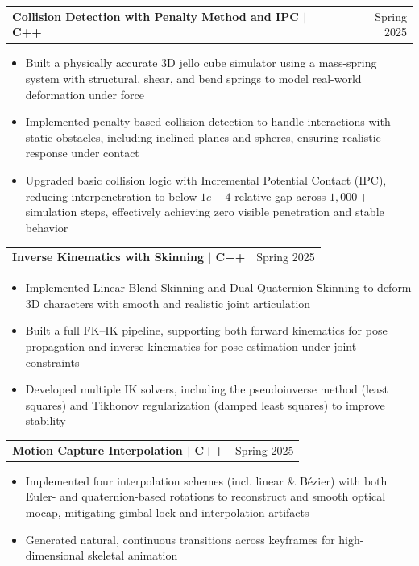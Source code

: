 \documentclass[letterpaper,11pt]{article}
\newcommand{\resumeItem}[1]{
  \item\small{
    {#1 
    }
  }
}
\newcommand{\resumeProjectHeading}[2]{
  \ifFirstSubheading
    \global\FirstSubheadingfalse
  \else
    \addvspace{4pt}
  \fi
  \item
  \begin{tabularx}{\textwidth}[t]{X r}
      \textbf{#1} & #2 \\
  \end{tabularx}
}
\newif\ifFirstSubheading
\newcommand{\resumeItemListStart}{\begin{itemize}}
\newcommand{\resumeItemListEnd}{\end{itemize}}
\begin{document}
  \resumeProjectHeading{\textbf{Collision Detection with Penalty Method and IPC} $|$ \normalfont C++}{Spring 2025}
  \resumeItemListStart
    \resumeItem{Built a physically accurate 3D jello cube simulator using a mass-spring system with structural, shear, and bend springs to model real-world deformation under force}
    \resumeItem{Implemented penalty-based collision detection to handle interactions with static obstacles, including inclined planes and spheres, ensuring realistic response under contact}
    \resumeItem{Upgraded basic collision logic with Incremental Potential Contact (IPC), reducing interpenetration to below $1e - 4$ relative gap across $1,000+$ simulation steps, effectively achieving zero visible penetration and stable behavior}
  \resumeItemListEnd
  \resumeProjectHeading{\textbf{Inverse Kinematics with Skinning} $|$ \normalfont C++}{Spring 2025}
  \resumeItemListStart
    \resumeItem{Implemented Linear Blend Skinning and Dual Quaternion Skinning to deform 3D characters with smooth and realistic joint articulation}
    \resumeItem{Built a full FK–IK pipeline, supporting both forward kinematics for pose propagation and inverse kinematics for pose estimation under joint constraints}
    \resumeItem{Developed multiple IK solvers, including the pseudoinverse method (least squares) and Tikhonov regularization (damped least squares) to improve stability}
  \resumeItemListEnd

  \resumeProjectHeading{\textbf{Motion Capture Interpolation} $|$ \normalfont C++}{Spring 2025}
  \resumeItemListStart
    \resumeItem{Implemented four interpolation schemes (incl. linear \& Bézier) with both Euler- and quaternion-based rotations to reconstruct and smooth optical mocap, mitigating gimbal lock and interpolation artifacts}
    \resumeItem{Generated natural, continuous transitions across keyframes for high-dimensional skeletal animation}
  \resumeItemListEnd
\end{document}
